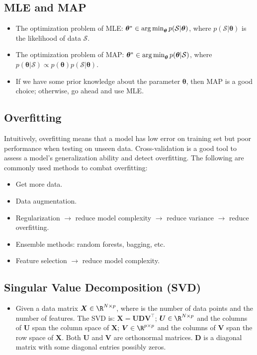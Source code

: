 \subsection{MLE and MAP}
    \begin{itemize}
        \item The optimization problem of MLE: $\bm{\theta}^\ast \in  \operatorname{arg\,min}_{\bm{\theta}} p(\mathcal{S} | \bm{\theta})$, where $p(\mathcal{S}| \bm{\theta})$ is the likelihood of data $\mathcal{S}$.
        \item The optimization problem of MAP: $\bm{\theta}^\ast \in  \operatorname{arg\,min}_{\bm{\theta}} p(\bm{\theta} | \mathcal{S})$, where $p(\bm{\theta} | \mathcal{S}) \propto p(\bm{\theta})p(\mathcal{S} | \bm{\theta})$.
        \item If we have some prior knowledge about the parameter $\bm{\theta}$, then MAP is a good choice; otherwise, go ahead and use MLE. 
    \end{itemize}
    

\subsection{Overfitting}
    Intuitively, overfitting means that a model has low error on training set but poor performance when testing on unseen data.
    Cross-validation is a good tool to assess a model's generalization ability and detect overfitting.
    The following are commonly used methods to combat overfitting:
        \begin{itemize}
            \item Get more data.
            \item Data augmentation.
            \item Regularization $ \rightarrow $ reduce model complexity $ \rightarrow $ reduce variance $ \rightarrow $ reduce overfitting.
            \item Ensemble methods: random forests, bagging, etc.
            \item Feature selection $ \rightarrow $ reduce model complexity.
        \end{itemize}



\subsection{Singular Value Decomposition (SVD)}
    \begin{itemize}
        \item Given a data matrix $\bm{X} \in \R^{\ndata \times \nfeat}$, where \ndata is the number of data points and \nfeat the number of features.
        The SVD is: $\bm{X} = \bm{U} \bm{D} \bm{V}^\top$; $\bm{U} \in \R^{\ndata \times \nfeat}$ and the columns of $\bm{U}$ span the column space of $\bm{X}$; $\bm{V} \in \R^{\nfeat \times \nfeat}$ and the columns of $\bm{V}$ span the row space of $\bm{X}$.
        Both $\bm{U}$ and $\bm{V}$ are orthonormal matrices. 
        $\bm{D}$ is a diagonal matrix with some diagonal entries possibly zeros.
    \end{itemize}
    
